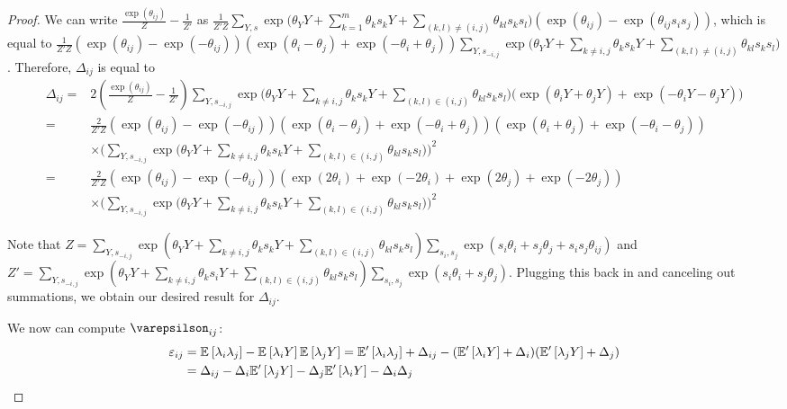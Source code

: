 \begin{proof}
We can write $\frac{\exp(\theta_{ij})}{Z} - \frac{1}{Z'}$ as $\frac{1}{Z' Z} \sum_{Y, s} \exp\big(\theta_Y Y + \sum_{k = 1}^m \theta_k s_k Y + \sum_{(k, l) \neq (i, j)} \theta_{kl} s_k s_l\big) (\exp(\theta_{ij}) - \exp(\theta_{ij} s_i s_j))$, which is equal to $\frac{1}{Z' Z} (\exp(\theta_{ij}) - \exp(-\theta_{ij})) (\exp(\theta_i - \theta_j) + \exp(-\theta_i + \theta_j)) \sum_{Y, s_{-i, j}} \exp\big(\theta_Y Y + \sum_{k \neq i, j} \theta_k s_k Y + \sum_{(k, l) \neq (i, j)} \theta_{kl} s_k s_l\big)$. Therefore, $\Delta_{ij}$ is equal to
\begin{align}
    \Delta_{ij} =& 2 \left(\frac{\exp(\theta_{ij})}{Z} - \frac{1}{Z'} \right) \sum_{Y, s_{-i, j}} \exp \big(\theta_Y Y + \sum_{k \neq i, j} \theta_k s_k Y + \sum_{(k, l) \in (i, j)} \theta_{kl} s_k s_l\big) \big(\exp(\theta_i Y + \theta_j Y) + \exp(-\theta_i Y - \theta_j Y) \big) \\
    =& \frac{2}{Z' Z} (\exp(\theta_{ij}) - \exp(-\theta_{ij})) (\exp(\theta_i - \theta_j) + \exp(-\theta_i + \theta_j))(\exp(\theta_i + \theta_j) + \exp(-\theta_i - \theta_j))  \\
    & \times \bigg(\sum_{Y, s_{-i, j}} \exp \big(\theta_Y Y + \sum_{k \neq i, j} \theta_k s_k Y + \sum_{(k, l) \in (i, j)} \theta_{kl} s_k s_l\big)\bigg)^2 \\
    =& \frac{2}{Z' Z} (\exp(\theta_{ij}) - \exp(-\theta_{ij})) (\exp(2\theta_i) + \exp(-2\theta_i) + \exp(2\theta_j) + \exp(-2\theta_j))  \\
    & \times \bigg(\sum_{Y, s_{-i, j}} \exp \big(\theta_Y Y + \sum_{k \neq i, j} \theta_k s_k Y + \sum_{(k, l) \in (i, j)} \theta_{kl} s_k s_l\big)\bigg)^2
\end{align}

Note that $Z = \sum_{Y, s_{-i, j}} \exp(\theta_Y Y + \sum_{k \neq i, j} \theta_k s_k Y + \sum_{(k, l) \in (i, j)} \theta_{kl} s_k s_l) \sum_{s_i, s_j} \exp(s_i \theta_i + s_j \theta_j + s_i s_j \theta_{ij})$ and $Z' = \sum_{Y, s_{-i, j}} \exp(\theta_Y Y + \sum_{k \neq i, j} \theta_k s_i Y + \sum_{(k, l) \in (i, j)} \theta_{kl} s_k s_l) \sum_{s_i, s_j} \exp(s_i \theta_i + s_j \theta_j)$. Plugging this back in and canceling out summations, we obtain our desired result for $\Delta_{ij}$.


We now can compute $\varepsilson_{ij}$:
\begin{align}
    \varepsilon_{ij} &= \mathbb{E}_{}\left[\lambda_i \lambda_j\right] - \mathbb{E}_{}\left[\lambda_i Y\right] \mathbb{E}_{}\left[\lambda_j Y\right] = \mathbb{E}'_{}\left[\lambda_i \lambda_j\right] + \Delta_{ij} - (\mathbb{E}'_{}\left[\lambda_i Y\right] + \Delta_i)(\mathbb{E}'_{}\left[\lambda_j Y\right] + \Delta_j) \\
    &= \Delta_{ij} - \Delta_i \mathbb{E}'_{}\left[\lambda_j Y\right] - \Delta_j \mathbb{E}'_{}\left[\lambda_i Y\right] - \Delta_i \Delta_j
\end{align}




\end{proof}

